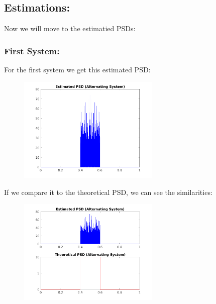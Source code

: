 \documentclass[a4paper,11pt]{article}
\begin{document}
\newpage

\subsection{Estimations:}

Now we will move to the estimatied PSDs:

\subsubsection{First System:}

For the first system we get this estimated PSD:

\begin{figure}[!hp]
    \begin{center}
      \includegraphics[width=0.6\textwidth]{images/study4/R_es_a.png}
    \end{center}
\end{figure}

If we compare it to the theoretical PSD, we can see the similarities:

\begin{figure}[!hp]
    \begin{center}
      \includegraphics[width=0.6\textwidth]{images/study4/comp_psd_a.png}
    \end{center}
\end{figure}
\end{document}
